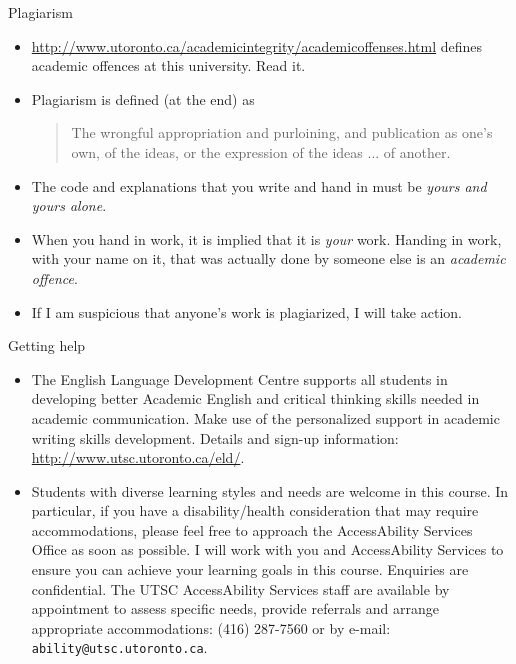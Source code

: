 \begin{frame}{Plagiarism}

  \begin{itemize}
  \item
    \url{http://www.utoronto.ca/academicintegrity/academicoffenses.html}
    defines academic offences at this university. Read it.
  \item Plagiarism is defined (at the end) as
    \begin{quote}
       The wrongful appropriation and purloining, and publication as one’s own, of the ideas, or the expression of the ideas ... of another.
    \end{quote}
    \item The code and
    explanations  that
    you write and hand in must be \emph{yours and yours
      alone}. 
    \item When you hand in work, it is implied that it is
    \emph{your} work. Handing in work, with your name on it, that was actually done by
    someone else is an \emph{academic offence}.
  \item If I am suspicious
    that anyone's work is plagiarized, I will take action.
    
  \end{itemize}
  
\end{frame}

\begin{frame}[fragile]{Getting help}

  \begin{itemize}
  \item The English Language Development Centre supports all students
    in developing better Academic English and critical thinking skills
    needed in academic communication. Make use of the personalized
    support in academic writing skills development. Details and sign-up information:
    \url{http://www.utsc.utoronto.ca/eld/}.
  \item      Students with diverse learning styles and needs are welcome in this
course. In particular, if you have a disability/health consideration
that may require accommodations, please feel free to approach the AccessAbility Services Office as soon as possible. I will
work with you and AccessAbility Services to ensure you can achieve
your learning goals in this course. Enquiries are confidential. The
UTSC AccessAbility Services staff are available by
appointment to assess specific needs, provide referrals and arrange
appropriate accommodations: (416) 287-7560 or by e-mail: \texttt{ability@utsc.utoronto.ca}.


  \end{itemize}
  
\end{frame}
